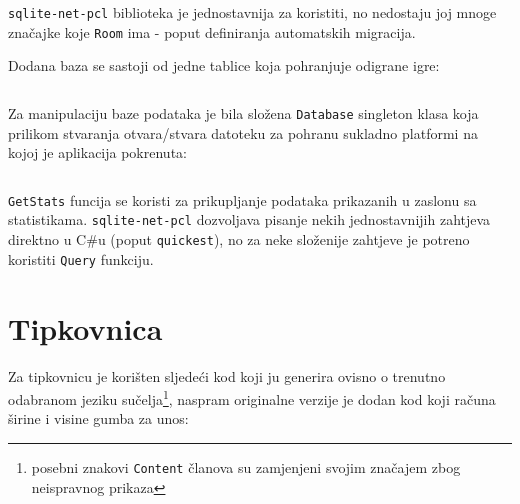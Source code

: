 \documentclass[12pt,a4paper]{report}
\begin{document}
\verb|sqlite-net-pcl| biblioteka je jednostavnija za koristiti, no nedostaju joj
mnoge značajke koje \verb|Room| ima - poput definiranja automatskih migracija.

Dodana baza se sastoji od jedne tablice koja pohranjuje odigrane igre:

\inputminted{cs}{../Wordel/Wordel/Data/PlayedGame.cs}
\newpage

Za manipulaciju baze podataka je bila složena \verb|Database| singleton klasa
koja prilikom stvaranja otvara/stvara datoteku za pohranu sukladno platformi
na kojoj je aplikacija pokrenuta:

\inputminted[breaklines]{cs}{../Wordel/Wordel/Data/Database.cs}

\verb|GetStats| funcija se koristi za prikupljanje podataka prikazanih u zaslonu
sa statistikama. \verb|sqlite-net-pcl| dozvoljava pisanje nekih jednostavnijih
zahtjeva direktno u C\#u (poput \verb|quickest|), no za neke složenije zahtjeve
je potreno koristiti \verb|Query| funkciju.

\newpage
\section{Tipkovnica}

Za tipkovnicu je korišten sljedeći kod koji ju generira ovisno o trenutno
odabranom jeziku sučelja\footnote[1]{posebni znakovi \verb|Content| članova su
zamjenjeni svojim značajem zbog neispravnog prikaza}, naspram originalne verzije
je dodan kod koji računa širine i visine gumba za unos:
\end{document}
